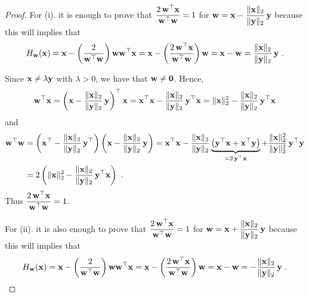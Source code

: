 \begin{proof}
 For (i). it is enough to prove that
$\displaystyle \frac{2\,\mathbf{w}^\top \mathbf{x}}{\mathbf{w}^\top\mathbf{w}} = 1$
for
$\displaystyle \mathbf{w} = \mathbf{x} - \frac{\|\mathbf{x}\|_2}{\|\mathbf{y}\|_2}
\, \mathbf{y}$ because this will implies that
\[
H_{\VEC{w}}(\VEC{x}) = \VEC{x} -\left(\frac{2}{\VEC{w}^\top\VEC{w}}\right)
\VEC{w}\VEC{w}^\top \VEC{x}
= \VEC{x} - \left(\frac{2\,\VEC{w}^\top \VEC{x}}{\VEC{w}^\top\VEC{w}}\right)
\VEC{w}
= \VEC{x} - \VEC{w} = \frac{\|\VEC{x}\|_2}{\|\VEC{y}\|_2}\, \VEC{y} \ .
\]

Since $\mathbf{x} \neq \lambda \mathbf{y}$ with $\lambda > 0$, we have that
$\mathbf{w} \neq \mathbf{0}$.   Hence,
\[
\mathbf{w}^\top\mathbf{x} =
\left( \mathbf{x} - \frac{\|\mathbf{x}\|_2}{\|\mathbf{y}\|_2} \, \mathbf{y} \right)^\top
\mathbf{x}
= \mathbf{x}^\top \mathbf{x}
- \frac{\|\mathbf{x}\|_2}{\|\mathbf{y}\|_2} \, \mathbf{y}^\top \mathbf{x}
= \|\mathbf{x}\|_2^2- \frac{\|\mathbf{x}\|_2}{\|\mathbf{y}\|_2} \, \mathbf{y}^\top \mathbf{x}
\]
and
\begin{align*}
\mathbf{w}^\top\mathbf{w} &= 
\left(\mathbf{x}^\top - \frac{\|\mathbf{x}\|_2}{\|\mathbf{y}\|_2}\, \mathbf{y}^\top \right)
\left(\mathbf{x} - \frac{\|\mathbf{x}\|_2}{\|\mathbf{y}\|_2} \, \mathbf{y} \right)
= \mathbf{x}^\top \mathbf{x} - \frac{\|\mathbf{x}\|_2}{\|\mathbf{y}\|_2}
\underbrace{\left( \mathbf{y}^\top\mathbf{x} + \mathbf{x}^\top\mathbf{y} \right)
}_{= 2\, \mathbf{y}^\top\mathbf{x}}
+ \frac{\|\mathbf{x}\|_2^2}{\|\mathbf{y}\|_2^2} \, \mathbf{y}^\top \mathbf{y} \\
&= 2 \left( \|\mathbf{x}\|_2^2 -
\frac{\|\mathbf{x}\|_2}{\|\mathbf{y}\|_2}\, \mathbf{y}^\top\mathbf{x}\right) \ .
\end{align*}
Thus $\displaystyle \frac{2\,\mathbf{w}^\top \mathbf{x}}{\mathbf{w}^\top\mathbf{w}} = 1$.

For (ii). it is also enough to prove that
$\displaystyle \frac{2\,\mathbf{w}^\top \mathbf{x}}{\mathbf{w}^\top\mathbf{w}} = 1$
for
$\displaystyle \mathbf{w} = \mathbf{x} + \frac{\|\mathbf{x}\|_2}{\|\mathbf{y}\|_2}
\, \mathbf{y}$ because this will implies that
\[
H_{\VEC{w}}(\VEC{x}) = \VEC{x} -\left(\frac{2}{\VEC{w}^\top\VEC{w}}\right)
\VEC{w}\VEC{w}^\top \VEC{x}
= \VEC{x} - \left(\frac{2\,\VEC{w}^\top \VEC{x}}{\VEC{w}^\top\VEC{w}}\right)
\VEC{w}
= \VEC{x} - \VEC{w} = - \frac{\|\VEC{x}\|_2}{\|\VEC{y}\|_2}\, \VEC{y} \ .
\]


\end{proof}
